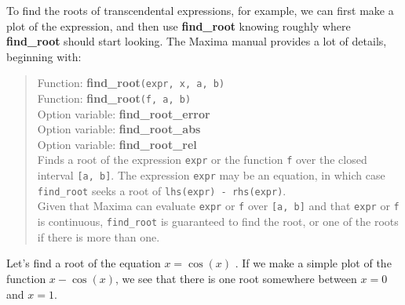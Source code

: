 \documentclass[12pt]{article}
\begin{document}
\smallskip
To find the roots of transcendental expressions, for example, we can first make a
  plot of the expression, and then use \textbf{find\_root} knowing roughly where
  \textbf{find\_root} should start looking.
The Maxima manual provides a lot of details, beginning with:
\small
\begin{quote}
Function: \textbf{find\_root}\verb|(expr, x, a, b) |\\
Function: \textbf{find\_root}\verb|(f, a, b) |\\
Option variable: \textbf{find\_root\_error }\\
Option variable: \textbf{find\_root\_abs }\\
Option variable: \textbf{find\_root\_rel }\\
Finds a root of the expression \verb|expr| or the function \verb|f| over the
   closed interval \verb|[a, b]|.
The expression \verb|expr| may be an equation, in which case \verb|find_root|
  seeks a root of \verb|lhs(expr) - rhs(expr)|.\\
Given that Maxima can evaluate \verb|expr| or \verb|f| over \verb|[a, b]|
   and that \verb|expr| or \verb|f| is continuous, \verb|find_root|
   is guaranteed to find the root, or one of the roots if there is more than one. \\
\end{quote}
\normalsize
Let's find a root of the equation $x = \cos(x)$ .
If we make a simple plot of the function $x - \cos(x)$, we see that there is one
  root somewhere between $x = 0$ and $x = 1$.
  
\end{document}

